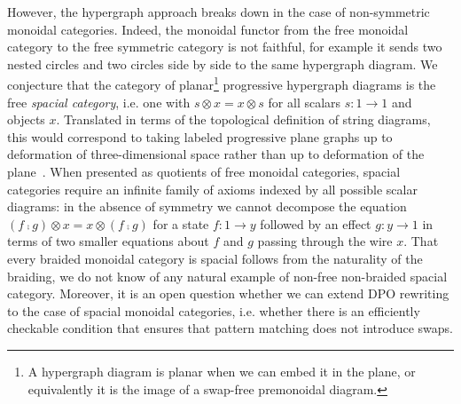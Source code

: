However, the hypergraph approach breaks down in the case of non-symmetric monoidal categories.
Indeed, the monoidal functor from the free monoidal category to the free symmetric category is not faithful, for example it sends two nested circles and two circles side by side to the same hypergraph diagram.
We conjecture that the category of planar\footnote
{A hypergraph diagram is planar when we can embed it in the plane, or equivalently it is the image of a swap-free premonoidal diagram.} progressive hypergraph diagrams is the free \emph{spacial category}, i.e. one with $s \otimes x = x \otimes s$ for all scalars $s : 1 \to 1$ and objects $x$.
Translated in terms of the topological definition of string diagrams, this would correspond to taking labeled progressive plane graphs up to deformation of three-dimensional space rather than up to deformation of the plane~\cite[Conjecture~3.4]{Selinger10}.
When presented as quotients of free monoidal categories, spacial categories require an infinite family of axioms indexed by all possible scalar diagrams: in the absence of symmetry we cannot decompose the equation $(f \fcmp g) \otimes x = x \otimes (f \fcmp g)$ for a state $f : 1 \to y$ followed by an effect $g : y \to 1$ in terms of two smaller equations about $f$ and $g$ passing through the wire $x$.
That every braided monoidal category is spacial follows from the naturality of the braiding, we do not know of any natural example of non-free non-braided spacial category.
Moreover, it is an open question whether we can extend DPO rewriting to the case of spacial monoidal categories, i.e. whether there is an efficiently checkable condition that ensures that pattern matching does not introduce swaps.

